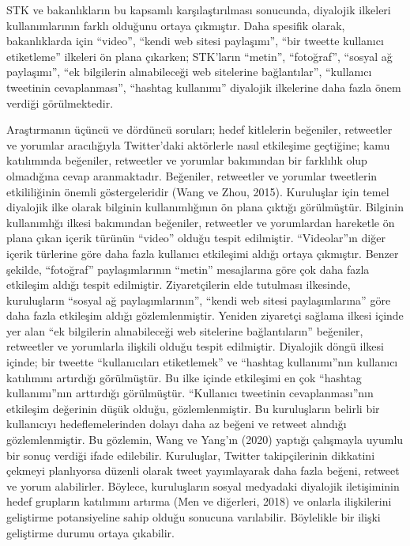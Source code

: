 \documentclass[
]{book}
\begin{document}
STK ve bakanlıkların bu kapsamlı karşılaştırılması sonucunda, diyalojik ilkeleri kullanımlarının farklı olduğunu ortaya çıkmıştır. Daha spesifik olarak, bakanlıklarda için ``video'', ``kendi web sitesi paylaşımı'', ``bir tweette kullanıcı etiketleme'' ilkeleri ön plana çıkarken; STK'ların ``metin'', ``fotoğraf'', ``sosyal ağ paylaşımı'', ``ek bilgilerin alınabileceği web sitelerine bağlantılar'', ``kullanıcı tweetinin cevaplanması'', ``hashtag kullanımı'' diyalojik ilkelerine daha fazla önem verdiği görülmektedir.

Araştırmanın üçüncü ve dördüncü soruları; hedef kitlelerin beğeniler, retweetler ve yorumlar aracılığıyla Twitter'daki aktörlerle nasıl etkileşime geçtiğine; kamu katılımında beğeniler, retweetler ve yorumlar bakımından bir farklılık olup olmadığına cevap aranmaktadır. Beğeniler, retweetler ve yorumlar tweetlerin etkililiğinin önemli göstergeleridir (Wang ve Zhou, 2015). Kuruluşlar için temel diyalojik ilke olarak bilginin kullanımlığının ön plana çıktığı görülmüştür. Bilginin kullanımlığı ilkesi bakımından beğeniler, retweetler ve yorumlardan hareketle ön plana çıkan içerik türünün ``video'' olduğu tespit edilmiştir. ``Videolar''ın diğer içerik türlerine göre daha fazla kullanıcı etkileşimi aldığı ortaya çıkmıştır. Benzer şekilde, ``fotoğraf'' paylaşımlarının ``metin'' mesajlarına göre çok daha fazla etkileşim aldığı tespit edilmiştir. Ziyaretçilerin elde tutulması ilkesinde, kuruluşların ``sosyal ağ paylaşımlarının'', ``kendi web sitesi paylaşımlarına'' göre daha fazla etkileşim aldığı gözlemlenmiştir. Yeniden ziyaretçi sağlama ilkesi içinde yer alan ``ek bilgilerin alınabileceği web sitelerine bağlantıların'' beğeniler, retweetler ve yorumlarla ilişkili olduğu tespit edilmiştir. Diyalojik döngü ilkesi içinde; bir tweette ``kullanıcıları etiketlemek'' ve ``hashtag kullanımı''nın kullanıcı katılımını artırdığı görülmüştür. Bu ilke içinde etkileşimi en çok ``hashtag kullanımı''nın arttırdığı görülmüştür. ``Kullanıcı tweetinin cevaplanması''nın etkileşim değerinin düşük olduğu, gözlemlenmiştir. Bu kuruluşların belirli bir kullanıcıyı hedeflemelerinden dolayı daha az beğeni ve retweet alındığı gözlemlenmiştir. Bu gözlemin, Wang ve Yang'ın (2020) yaptığı çalışmayla uyumlu bir sonuç verdiği ifade edilebilir. Kuruluşlar, Twitter takipçilerinin dikkatini çekmeyi planlıyorsa düzenli olarak tweet yayımlayarak daha fazla beğeni, retweet ve yorum alabilirler. Böylece, kuruluşların sosyal medyadaki diyalojik iletişiminin hedef grupların katılımını artırma (Men ve diğerleri, 2018) ve onlarla ilişkilerini geliştirme potansiyeline sahip olduğu sonucuna varılabilir. Böylelikle bir ilişki geliştirme durumu ortaya çıkabilir.
\end{document}
